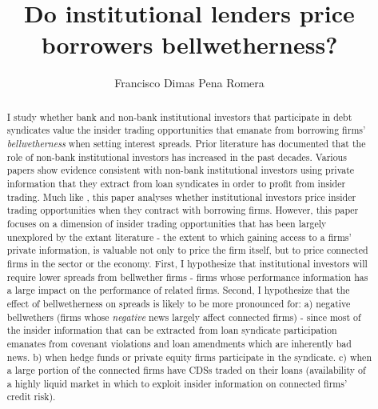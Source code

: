\documentclass[english, 1p]{elsarticle}
\begin{document}
\title{Do institutional lenders price borrowers bellwetherness?}



\author{Francisco Dimas Pena Romera}

\address{Accounting PhD Student}
\address{Kenan-Flagler Business School, University of North Carolina, Chapel Hill, NC 27599-3490, USA}
\address{Jeffs Seminar 2015 - Summer paper research proposal}



\pagebreak


\begin{abstract}
	
	
	I study whether bank and non-bank institutional investors that participate in debt syndicates value the insider trading opportunities that emanate from borrowing firms' \textit{bellwetherness} when setting interest spreads. Prior literature has documented that the role of non-bank institutional investors has increased in the past decades. Various papers show evidence consistent with non-bank institutional investors using private information that they extract from loan syndicates in order to profit from insider trading. Much like \cite{Bushman2014}, this paper analyses whether institutional investors price insider trading opportunities when they contract with borrowing firms. However, this paper focuses on a dimension of insider trading opportunities that has been largely unexplored by the extant literature - the extent to which gaining access to a firms' private information, is valuable not only to price the firm itself, but to price connected firms in the sector or the economy. First, I hypothesize that institutional investors will require lower spreads from bellwether firms - firms whose performance information has a large impact on the performance of related firms. Second, I hypothesize that the effect of bellwetherness on spreads is likely to be more pronounced for: a) negative bellwethers (firms whose \textit{negative} news largely affect connected firms) - since most of the insider information that can be extracted from loan syndicate participation emanates from covenant violations and loan amendments which are inherently bad news. b) when hedge funds or private equity firms participate in the syndicate. c) when a large portion of the connected firms have CDSs traded on their loans (availability of a highly liquid market in which to exploit insider information on connected firms' credit risk). 
	
\end{abstract}
\end{document}
